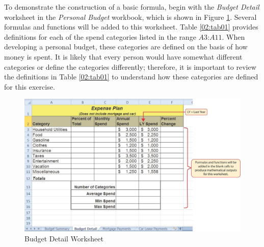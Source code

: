 To demonstrate the construction of a basic formula, begin with the \textit{Budget Detail} worksheet in the \textit{Personal Budget} workbook, which is shown in Figure \ref{02:fig02}. Several formulas and functions will be added to this worksheet. Table \ref{02:tab01} provides definitions for each of the spend categories listed in the range $ A3 $:$ A11 $. When developing a personal budget, these categories are defined on the basis of how money is spent. It is likely that every person would have somewhat different categories or define the categories differently; therefore, it is important to review the definitions in Table \ref{02:tab01} to understand how these categories are defined for this exercise.

\begin{figure}[H]
	\centering
	\includegraphics[width=\maxwidth{.95\linewidth}]{gfx/ch02_fig02}
	\caption{Budget Detail Worksheet}
	\label{02:fig02}
\end{figure}

